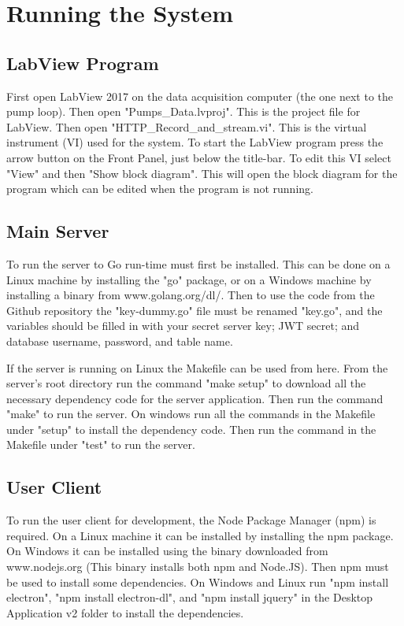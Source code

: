 \documentclass[10pt,technote]{IEEEtran}
\begin{document}
\section{Running the System}
\subsection{LabView Program}
First open LabView 2017 on the data acquisition computer (the one next to the pump loop). Then open "Pumps\_Data.lvproj". This is the project file for LabView. Then open "HTTP\_Record\_and\_stream.vi". This is the virtual instrument (VI) used for the system. To start the LabView program press the arrow button on the Front Panel, just below the title-bar. To edit this VI select "View" and then "Show block diagram". This will open the block diagram for the program which can be edited when the program is not running.
\subsection{Main Server}
To run the server to Go run-time must first be installed. This can be done on a Linux machine by installing the "go" package, or on a Windows machine by installing a binary from www.golang.org/dl/. Then to use the code from the Github repository the "key-dummy.go" file must be renamed "key.go", and the variables should be filled in with your secret server key; JWT secret; and database username, password, and table name.
\par
If the server is running on Linux the Makefile can be used from here. From the server's root directory run the command "make setup" to download all the necessary dependency code for the server application. Then run the command "make" to run the server. On windows run all the commands in the Makefile under "setup" to install the dependency code. Then run the command in the Makefile under "test" to run the server.
\subsection{User Client}
To run the user client for development, the Node Package Manager (npm) is required. On a Linux machine it can be installed by installing the npm package. On Windows it can be installed using the binary downloaded from www.nodejs.org (This binary installs both npm and Node.JS). Then npm must be used to install some dependencies. On Windows and Linux run "npm install electron", "npm install electron-dl", and "npm install jquery" in the Desktop Application v2 folder to install the dependencies.
\end{document}
